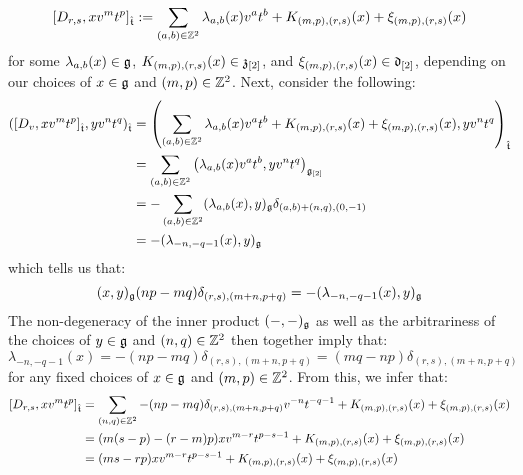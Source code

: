 \begin{remark}
\begin{enumerate}
                    $$[D_{r, s}, x v^m t^p]_{\hat{\mathfrak{t}}} := \sum_{(a, b) \in \mathbb{Z}^2} \lambda_{a, b}(x) v^a t^b + K_{(m, p), (r, s)}(x) + \xi_{(m, p), (r, s)}(x)$$
                for some $\lambda_{a, b}(x) \in \mathfrak{g}$, $K_{(m, p), (r, s)}(x) \in \mathfrak{z}_{[2]}$, and $\xi_{(m, p), (r, s)}(x) \in \mathfrak{d}_{[2]}$, depending on our choices of $x \in \mathfrak{g}$ and $(m, p) \in \mathbb{Z}^2$. Next, consider the following:
                    $$
                        \begin{aligned}
                            ( [D_v, x v^m t^p]_{\hat{\mathfrak{t}}}, y v^n t^q )_{\hat{\mathfrak{t}}} & = \left( \sum_{(a, b) \in \mathbb{Z}^2} \lambda_{a, b}(x) v^a t^b + K_{(m, p), (r, s)}(x) + \xi_{(m, p), (r, s)}(x), y v^n t^q \right)_{\hat{\mathfrak{t}}}
                            \\
                            & = \sum_{(a, b) \in \mathbb{Z}^2} \left( \lambda_{a, b}(x) v^a t^b, y v^n t^q \right)_{\mathfrak{g}_{[2]}}
                            \\
                            & = -\sum_{(a, b) \in \mathbb{Z}^2} (\lambda_{a, b}(x), y)_{\mathfrak{g}} \delta_{ (a, b) + (n, q), (0, -1) }
                            \\
                            & = -(\lambda_{-n, -q - 1}(x), y)_{\mathfrak{g}}
                        \end{aligned}
                    $$
                which tells us that:
                    $$(x, y)_{\mathfrak{g}} (np - mq) \delta_{(r, s), (m + n, p + q)} = -(\lambda_{-n, -q - 1}(x), y)_{\mathfrak{g}}$$
                The non-degeneracy of the inner product $(-, -)_{\mathfrak{g}}$ as well as the arbitrariness of the choices of $y \in \mathfrak{g}$ and $(n, q) \in \mathbb{Z}^2$ then together imply that:
                    $$\lambda_{-n, -q - 1}(x) = -(np - mq) \delta_{(r, s), (m + n, p + q)} = (mq - np) \delta_{(r, s), (m + n, p + q)}$$
                for any fixed choices of $x \in \mathfrak{g}$ and $(m, p) \in \mathbb{Z}^2$. From this, we infer that:
                    $$
                        \begin{aligned}
                            [D_{r, s}, x v^m t^p]_{\extendedtoroidal} & = \sum_{(n, q) \in \Z^2} -(np - mq) \delta_{(r, s), (m + n, p + q)} v^{-n} t^{-q - 1} + K_{(m, p), (r, s)}(x) + \xi_{(m, p), (r, s)}(x)
                            \\
                            & = ( m(s - p) - (r - m)p ) x v^{m - r} t^{p - s - 1} + K_{(m, p), (r, s)}(x) + \xi_{(m, p), (r, s)}(x)
                            \\
                            & = ( ms - rp ) x v^{m - r} t^{p - s - 1} + K_{(m, p), (r, s)}(x) + \xi_{(m, p), (r, s)}(x)
                        \end{aligned}
                    $$
                    

\end{enumerate}
\end{remark}
